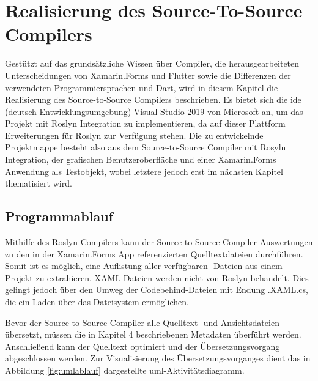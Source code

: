 \chapter{Realisierung des Source-To-Source Compilers}
\label{chap:Realisierung}
Gestützt auf das grundsätzliche Wissen über Compiler, die herausgearbeiteten Unterscheidungen von  Xamarin.Forms und Flutter sowie die Differenzen der verwendeten Programmiersprachen  \Csharp{} und Dart, wird in diesem Kapitel die Realisierung des Source-to-Source Compilers beschrieben.  Es bietet sich die \ac{ide} (deutsch Entwicklungsumgebung) Visual Studio 2019 von Microsoft an,  um das Projekt mit Roslyn Integration zu implementieren,  da auf dieser Plattform Erweiterungen für Roslyn zur Verfügung stehen.
Die zu entwickelnde Projektmappe besteht also aus dem Source-to-Source Compiler mit Rosyln Integration, der grafischen Benutzeroberfläche und einer Xamarin.Forms
Anwendung als Testobjekt,  wobei letztere jedoch erst im nächsten Kapitel thematisiert wird.


\section{Programmablauf}
Mithilfe des Roslyn Compilers kann der Source-to-Source Compiler Auswertungen zu den in der Xamarin.Forms App referenzierten Quelltextdateien durchführen.  Somit ist es möglich,  eine Auflistung aller verfügbaren \Csharp-Dateien aus einem Projekt zu extrahieren.  XAML-Dateien werden nicht von Roslyn behandelt.  Dies gelingt jedoch über den Umweg der Codebehind-Dateien mit Endung .XAML.cs,  die ein Laden über das Dateisystem ermöglichen. 

Bevor der Source-to-Source Compiler alle Quelltext- und Ansichtsdateien übersetzt,  müssen die in Kapitel 4 beschriebenen Metadaten überführt werden.  Anschließend kann der Quelltext optimiert und der Übersetzungsvorgang abgeschlossen werden.  Zur Visualisierung des Übersetzungsvorganges dient das in Abbildung \ref{fig:umlablauf} dargestellte \ac{uml}-Aktivitätsdiagramm.

